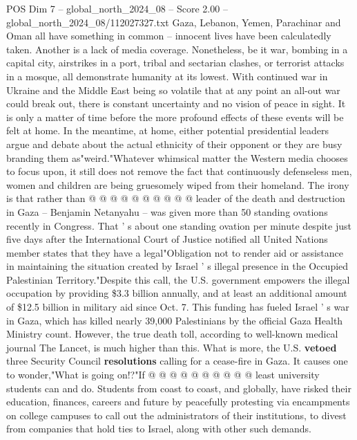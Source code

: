 \begin{textsample}{POS Dim 7 – global\_north\_2024\_08 – Score 2.00 – global\_north\_2024\_08/112027327.txt}  \label{ex:f7_pos_361}
Gaza, Lebanon, Yemen, Parachinar and Oman all have something in common -- innocent lives have been calculatedly taken.
Another is a lack of media coverage.
Nonetheless, be it war, bombing in a capital city, airstrikes in a port, tribal and sectarian clashes, or terrorist attacks in a mosque, all demonstrate humanity at its lowest.
With continued war in Ukraine and the Middle East being so volatile that at any point an all-out war could break out, there is constant uncertainty and no vision of peace in sight.
It is only a matter of time before the more profound effects of these events will be felt at home.
In the meantime, at home, either potential presidential leaders argue and debate about the actual ethnicity of their opponent or they are busy branding them as"weird."Whatever whimsical matter the Western media chooses to focus upon, it still does not remove the fact that continuously defenseless men, women and children are being gruesomely wiped from their homeland.
The irony is that rather than @ @ @ @ @ @ @ @ @ @ leader of the death and destruction in Gaza -- Benjamin Netanyahu -- was given more than 50 standing ovations recently in Congress.
That ' s about one standing ovation per minute despite just five days after the International Court of Justice notified all United Nations member states that they have a legal"Obligation not to render aid or assistance in maintaining the situation created by Israel ' s illegal presence in the Occupied Palestinian Territory."Despite this call, the U.S. government empowers the illegal occupation by providing \$3.3 billion annually, and at least an additional amount of \$12.5 billion in military aid since Oct. 7.
This funding has fueled Israel ' s war in Gaza, which has killed nearly 39,000 Palestinians by the official Gaza Health Ministry count.
However, the true death toll, according to well-known medical journal The Lancet, is much higher than this.
What is more, the U.S. \textbf{vetoed} three Security Council \textbf{resolutions} calling for a cease-fire in Gaza.
It causes one to wonder,"What is going on!?"If @ @ @ @ @ @ @ @ @ @ least university students can and do.
Students from coast to coast, and globally, have risked their education, finances, careers and future by peacefully protesting via encampments on college campuses to call out the administrators of their institutions, to divest from companies that hold ties to Israel, along with other such demands.

\end{textsample}
